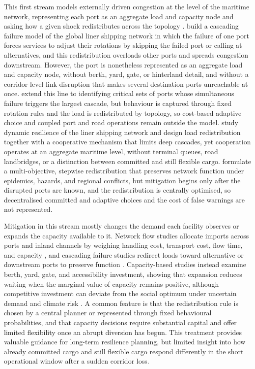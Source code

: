 \documentclass[a4paper,fleqn]{cas-sc}
\begin{document}
This first stream models externally driven congestion at the level of the maritime network, representing each port as an aggregate load and capacity node and asking how a given shock redistributes across the topology \citep{XuEtAl2025,CaoEtAl2025}. \citet{XuEtAl2022} build a cascading failure model of the global liner shipping network in which the failure of one port forces services to adjust their rotations by skipping the failed port or calling at alternatives, and this redistribution overloads other ports and spreads congestion downstream. However, the port is nonetheless represented as an aggregate load and capacity node, without berth, yard, gate, or hinterland detail, and without a corridor-level link disruption that makes several destination ports unreachable at once. \citet{XuEtAl2025} extend this line to identifying critical sets of ports whose simultaneous failure triggers the largest cascade, but behaviour is captured through fixed rotation rules and the load is redistributed by topology, so cost-based adaptive choice and coupled port and road operations remain outside the model. \citet{LuEtAl2024} study dynamic resilience of the liner shipping network and design load redistribution together with a cooperative mechanism that limits deep cascades, yet cooperation operates at an aggregate maritime level, without terminal queues, road landbridges, or a distinction between committed and still flexible cargo. \citet{CaoEtAl2025} formulate a multi-objective, stepwise redistribution that preserves network function under epidemics, hazards, and regional conflicts, but mitigation begins only after the disrupted ports are known, and the redistribution is centrally optimised, so decentralised committed and adaptive choices and the cost of false warnings are not represented.

Mitigation in this stream mostly changes the demand each facility observes or expands the capacity available to it. Network flow studies allocate imports across ports and inland channels by weighing handling cost, transport cost, flow time, and capacity \citep{JulaLeachman2011,LeachmanJula2011,FanEtAl2012}, and cascading failure studies redirect loads toward alternative or downstream ports to preserve function \citep{LuEtAl2024,CaoEtAl2025}. Capacity-based studies instead examine berth, yard, gate, and accessibility investment, showing that expansion reduces waiting when the marginal value of capacity remains positive, although competitive investment can deviate from the social optimum under uncertain demand and climate risk \citep{FanEtAl2012,ChenLiu2016,WangZhang2018,XiaEtAl2024}. A common feature is that the redistribution rule is chosen by a central planner or represented through fixed behavioural probabilities, and that capacity decisions require substantial capital and offer limited flexibility once an abrupt diversion has begun. This treatment provides valuable guidance for long-term resilience planning, but limited insight into how already committed cargo and still flexible cargo respond differently in the short operational window after a sudden corridor loss.
\end{document}
